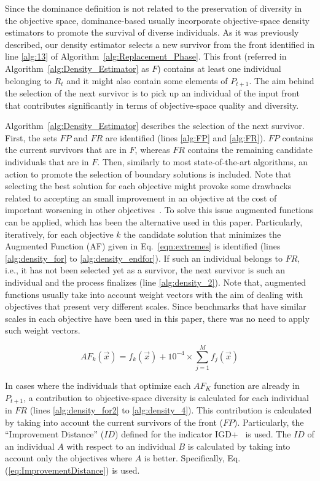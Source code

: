 Since the dominance definition is not related to the preservation of diversity in the objective space,
dominance-based \MOEAS{} usually incorporate objective-space density estimators to promote the survival
of diverse individuals.
%
As it was previously described, our density estimator selects a new survivor from the front identified
in line \ref{alg:13} of Algorithm~\ref{alg:Replacement_Phase}.
%
This front (referred in Algorithm~\ref{alg:Density_Estimator}  as $F$) contains at least one individual belonging to $R_t$ and it might also contain some elements 
of $P_{t+1}$.
%
The aim behind the selection of the next survivor is to pick up an individual of the input front
that contributes significantly in terms of objective-space quality and diversity. %

Algorithm~\ref{alg:Density_Estimator} describes the selection of the next survivor.
%
First, the sets $FP$ and $FR$ are identified (lines \ref{alg:FP} and \ref{alg:FR}).
%
$FP$ contains the current survivors that are in $F$, whereas $FR$ contains
the remaining candidate individuals that are in $F$.
%
Then, similarly to most state-of-the-art algorithms, an action to promote the selection of boundary solutions
is included.
%
Note that selecting the best solution for each objective might provoke some drawbacks related to accepting an small improvement
in an objective at the cost of important worsening in other objectives~\cite{deb2016optimality}.
%
To solve this issue augmented functions can be applied, which has been the alternative used in this paper.
%
Particularly, iteratively, for each objective $k$ the candidate solution that minimizes the Augmented Function (AF)
given in Eq.~\ref{eqn:extremes} is identified (lines \ref{alg:density_for} to \ref{alg:density_endfor}).
%
If such an individual belongs to $FR$, i.e., it has not been selected yet as a survivor, the next survivor is such an individual
and the process finalizes (line \ref{alg:density_2}).
%
Note that, augmented functions usually take into account weight vectors with the aim of dealing with objectives
that present very different scales.
%
Since benchmarks that have similar scales in each objective have been used in this paper, there was no need to apply
such weight vectors.

\begin{equation}\label{eqn:extremes}
AF_k (\vec{x}) = f_k(\vec{x}) + 10^{-4} \times  \sum_{j=1}^M f_j( \vec{x} )
\end{equation}

In cases where the individuals that optimize each $AF_K$ function are already in $P_{t+1}$, a contribution
to objective-space diversity is calculated for each individual in $FR$ (lines \ref{alg:density_for2} to \ref{alg:density_4}).
%
This contribution is calculated by taking into account the current survivors of the front ($FP$).
%
%
Particularly, the ``Improvement Distance'' ($ID$) defined for the indicator IGD+~\cite{Joel:Inverted_Generational_Distance_Plus}
is used.
%
The $ID$ of an individual $A$ with respect to an individual $B$ is calculated by taking into account only the objectives
where $A$ is better.
%
Specifically, Eq. (\ref{eq:ImprovementDistance}) is used.

